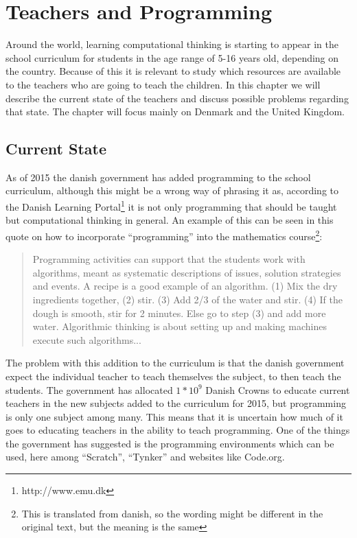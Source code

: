 \chapter{Teachers and Programming}
\label{chap:teaching}
Around the world, learning computational thinking is starting to appear in the school curriculum for students in the age range of 5-16 years old, depending on the country. Because of this it is relevant to study which resources are available to the teachers who are going to teach the children. In this chapter we will describe the current state of the teachers and discuss possible problems regarding that state. The chapter will focus mainly on Denmark and the United Kingdom.

\section{Current State}
As of 2015 the danish government has added programming to the school curriculum, although this might be a wrong way of phrasing it as, according to the Danish Learning Portal\footnote{http://www.emu.dk} it is not only programming that should be taught but computational thinking in general. An example of this can be seen in this quote on how to incorporate ``programming'' into the mathematics course\footnote{This is translated from danish, so the wording might be different in the original text, but the meaning is the same}:
\begin{quote}
Programming activities can support that the students work with algorithms, meant as systematic descriptions of issues, solution strategies and events. A recipe is a good example of an algorithm. (1) Mix the dry ingredients together, (2) stir. (3) Add 2/3 of the water and stir. (4) If the dough is smooth, stir for 2 minutes. Else go to step (3) and add more water. Algorithmic thinking is about setting up and making machines execute such algorithms...\cite{1}
\end{quote}

The problem with this addition to the curriculum is that the danish government expect the individual teacher to teach themselves the subject, to then teach the students. The government has allocated $1*10^9$ Danish Crowns to educate current teachers in the new subjects added to the curriculum for 2015, but programming is only one subject among many. This means that it is uncertain how much of it goes to educating teachers in the ability to teach programming. One of the things the government has suggested is the programming environments which can be used, here among ``Scratch'', ``Tynker'' and websites like Code.org.

